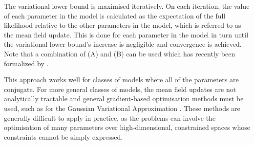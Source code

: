 The variational lower bound is maximised iteratively. On each iteration, the
value of each parameter in the model is calculated as the expectation of the
full likelihood relative to the other parameters in the model, which is referred
to as the mean field update. This is done for each parameter in the model in
turn until the variational lower bound's increase is negligible and convergence
is achieved. Note that a combination of (A) and (B) can be used which has
recently been formalized by \cite{Rohde2015}.

This approach works well for classes of models where all of the parameters are
conjugate. For more general classes of models, the mean field updates are not
analytically tractable and general gradient-based optimisation methods must be
used, such as for the Gaussian Variational Approximation \cite{Ormerod2012}.
These methods are generally difficult to apply in practice, as the problems can
involve the optimisation of many parameters over high-dimensional, constrained
spaces whose constraints cannot be simply expressed.








